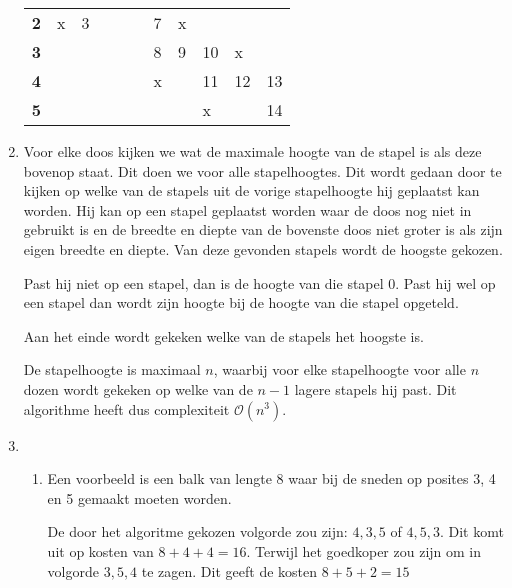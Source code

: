 \documentclass[11pt]{article}
\newcommand{\bigO}{\ensuremath{\mathcal{O}}}
\begin{document}
\begin{enumerate}
\begin{table}[H]
\begin{tabular}{lllllllllll}
		\textbf{2} & x          & 3          &            &            &            & 7          & x          &            &            &            \\
		\textbf{3} &            &            &            &            &            & 8          & 9          & 10         & x          &            \\
		\textbf{4} &            &            &            &            &            & x          &            & 11         & 12         & 13         \\
		\textbf{5} &            &            &            &            &            &            &            & x &            & 14         \\ \hline
		\end{tabular}
		\end{table}




    \item
        Voor elke doos kijken we wat de maximale hoogte van de stapel is als
        deze bovenop staat. Dit doen we voor alle stapelhoogtes. Dit wordt
        gedaan door te kijken op welke van de stapels uit de vorige stapelhoogte
        hij geplaatst kan worden. Hij kan op een stapel geplaatst worden waar de
        doos nog niet in gebruikt is en de breedte en diepte van de bovenste
        doos niet groter is als zijn eigen breedte en diepte. Van deze gevonden
        stapels wordt de hoogste gekozen.

        Past hij niet op een stapel, dan is de hoogte van die stapel 0. Past hij
        wel op een stapel dan wordt zijn hoogte bij de hoogte van die stapel
        opgeteld.

        Aan het einde wordt gekeken welke van de stapels het hoogste is.

        De stapelhoogte is maximaal $n$, waarbij voor elke stapelhoogte voor
        alle $n$ dozen wordt gekeken op welke van de $n - 1$ lagere stapels hij
        past. Dit algorithme heeft dus complexiteit \bigO$(n^3)$.

    \item
        \begin{enumerate}
            \item
                Een voorbeeld is een balk van lengte 8 waar bij de sneden op
                posites 3, 4 en 5 gemaakt moeten worden.

                De door het algoritme gekozen volgorde zou zijn: $4, 3, 5$ of
                $4, 5, 3$. Dit komt uit op kosten van $8+4+4=16$. Terwijl het
                goedkoper zou zijn om in volgorde $3, 5, 4$ te zagen. Dit geeft
                de kosten $8+5+2=15$


\end{enumerate}
\end{enumerate}
\end{document}
